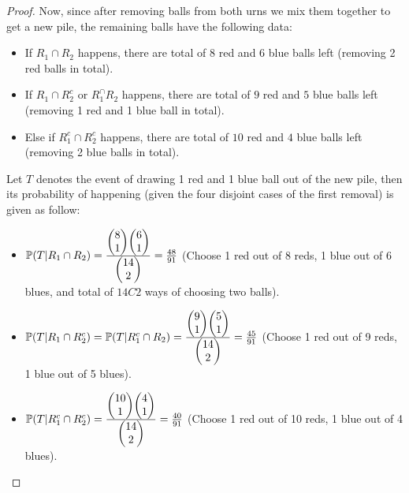 \documentclass{article}
\begin{document}
\begin{proof}
    Now, since after removing balls from both urns we mix them together to get a new pile, the remaining balls have the following data:
    \begin{itemize}
        \item If $R_1\cap R_2$ happens, there are total of $8$ red and $6$ blue balls left (removing 2 red balls in total).
        \item If $R_1\cap R_2^c$ or $R_1^\cap R_2$ happens, there are total of $9$ red and $5$ blue balls left (removing 1 red and 1 blue ball in total).
        \item Else if $R_1^c\cap R_2^c$ happens, there are total of $10$ red and $4$ blue balls left (removing 2 blue balls in total).
    \end{itemize}
    Let $T$ denotes the event of drawing 1 red and 1 blue ball out of the new pile, then its probability of happening (given the four disjoint cases of the first removal) is given as follow:
    \begin{itemize}
        \item $\mathbb{P}(T|R_1\cap R_2)=\frac{\begin{pmatrix}8\\1\end{pmatrix}\begin{pmatrix}6\\1\end{pmatrix}}{\begin{pmatrix}14\\2\end{pmatrix}}=\frac{48}{91}$ (Choose 1 red out of 8 reds, 1 blue out of 6 blues, and total of $14C2$ ways of choosing two balls).
        \item $\mathbb{P}(T|R_1\cap R_2^c)=\mathbb{P}(T|R_1^c\cap R_2)=\frac{\begin{pmatrix}9\\1\end{pmatrix}\begin{pmatrix}5\\1\end{pmatrix}}{\begin{pmatrix}14\\2\end{pmatrix}}=\frac{45}{91}$ (Choose 1 red out of 9 reds, 1 blue out of 5 blues).
        \item $\mathbb{P}(T|R_1^c\cap R_2^c)=\frac{\begin{pmatrix}10\\1\end{pmatrix}\begin{pmatrix}4\\1\end{pmatrix}}{\begin{pmatrix}14\\2\end{pmatrix}}=\frac{40}{91}$ (Choose 1 red out of 10 reds, 1 blue out of 4 blues).

\end{itemize}
\end{proof}
\end{document}
